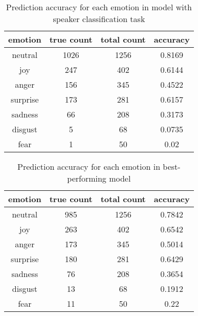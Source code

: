 \documentclass[11pt]{article}
\begin{document}
\begin{table}[hbt]
  \centering
  \begin{tabular}{c|c|c|c}
    emotion & true count & total count & accuracy \\
    \hline
    neutral & 1026 & 1256 & 0.8169 \\
    \hline
    joy & 247 & 402 & 0.6144 \\
    \hline
    anger & 156 & 345 & 0.4522  \\
    \hline
    surprise & 173 & 281 & 0.6157 \\
    \hline
    sadness & 66 & 208 & 0.3173 \\
    \hline
    disgust & 5 & 68 & 0.0735  \\
    \hline
    fear & 1 & 50 & 0.02 \\
  \end{tabular}
  \caption{Prediction accuracy for each emotion in model with speaker classification task}
\end{table}

\begin{table}[hbt]
  \centering
  \begin{tabular}{c|c|c|c}
    emotion & true count & total count & accuracy \\
    \hline
    neutral & 985 & 1256 & 0.7842 \\
    \hline
    joy & 263 & 402 & 0.6542 \\
    \hline
    anger & 173 & 345 & 0.5014  \\
    \hline
    surprise & 180 & 281 & 0.6429 \\
    \hline
    sadness & 76 & 208 & 0.3654\\
    \hline
    disgust  & 13 & 68 & 0.1912  \\
    \hline
    fear & 11 & 50 & 0.22 \\
  \end{tabular}
  \caption{Prediction accuracy for each emotion in best-performing model}
\end{table}
\end{document}
